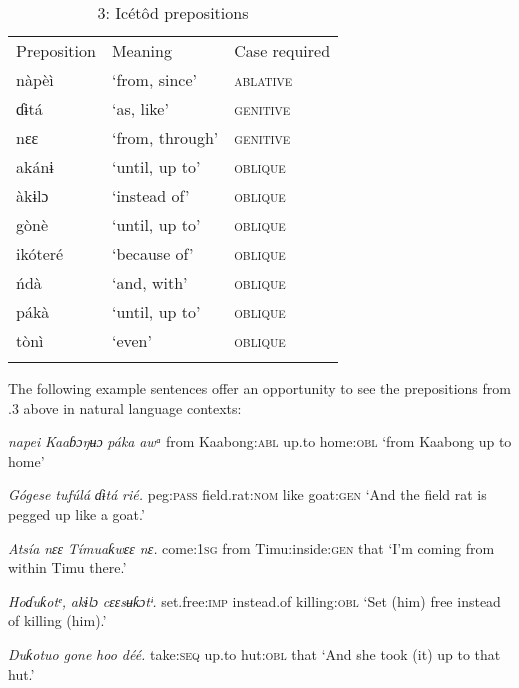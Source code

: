\begin{table}
\caption{3: Icétôd prepositions}
\label{tab:3}


\begin{tabularx}{\textwidth}{XXX}
\lsptoprule

Preposition & Meaning & Case required\\
nàpèì & ‘from, since’ & \textsc{ablative}\\
ɗɨtá & ‘as, like’ & \textsc{genitive}\\
nɛɛ & ‘from, through’ & \textsc{genitive}\\
akánɨ & ‘until, up to’ & \textsc{oblique}\\
àkɨlɔ & ‘instead of’ & \textsc{oblique}\\
gònè & ‘until, up to’ & \textsc{oblique}\\
ikóteré & ‘because of’ & \textsc{oblique}\\
ńdà & ‘and, with’ & \textsc{oblique}\\
pákà & ‘until, up to’ & \textsc{oblique}\\
tònì & ‘even’ & \textsc{oblique}\\
\lspbottomrule
\end{tabularx}
\end{table}
The following example sentences offer an opportunity to see the prepositions from .3 above in natural language contexts:


 
\textit{napei}\textit{ Kaaɓɔŋʉɔ     }\textit{páka}\textit{   awᵃ} 
from   Kaabong:\textsc{abl}   up.to   home:\textsc{obl} 
‘from Kaabong up to home’

\textit{Gógese   tufúlá       }\textit{ɗɨtá}\textit{   rié.}
peg:\textsc{pass}   field.rat:\textsc{nom}   like   goat:\textsc{gen}
‘And the field rat is pegged up like a goat.’





\textit{Atsía     }\textit{nɛɛ}\textit{   Tímuaƙwɛɛ     nɛ.}
come:\textsc{1sg}   from   Timu:inside:\textsc{gen}   that
‘I’m coming from within Timu there.’




\textit{Hoɗuƙotᵉ,   }\textit{akɨlɔ}\textit{     cɛɛsʉƙɔtᶤ.}
set.free:\textsc{imp}   instead.of   killing:\textsc{obl}
‘Set (him) free instead of killing (him).’




\textit{Duƙotuo   }\textit{gone}\textit{   hoo     déé.}
take:\textsc{seq}   up.to   hut:\textsc{obl}   that
‘And she took (it) up to that hut.’




